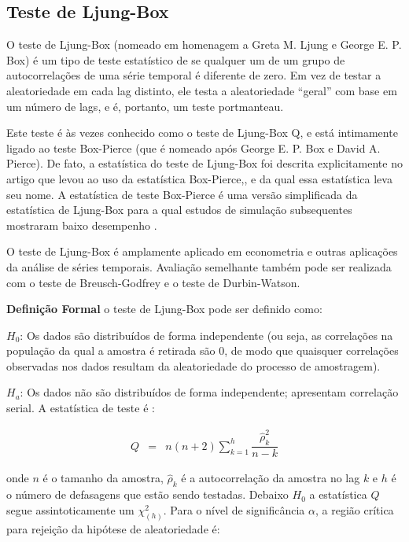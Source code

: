\subsection{Teste de Ljung-Box}

O teste de Ljung-Box (nomeado em homenagem a Greta M. Ljung e George E. P. Box) é um tipo de teste estatístico de se qualquer um de um grupo de autocorrelações de uma série temporal é diferente de zero. Em vez de testar a aleatoriedade em cada lag distinto, ele testa a aleatoriedade ``geral'' com base em um número de lags, e é, portanto, um teste portmanteau.

Este teste é às vezes conhecido como o teste de Ljung-Box Q, e está intimamente ligado ao teste Box-Pierce (que é nomeado após George E. P. Box e David A. Pierce). De fato, a estatística do teste de Ljung-Box foi descrita explicitamente no artigo que levou ao uso da estatística Box-Pierce,\cite{box}, \cite{ljung} e da qual essa estatística leva seu nome. A estatística de teste Box-Pierce é uma versão simplificada da estatística de Ljung-Box para a qual estudos de simulação subsequentes mostraram baixo desempenho \cite{dav}.

O teste de Ljung-Box é amplamente aplicado em econometria e outras aplicações da análise de séries temporais. Avaliação semelhante também pode ser realizada com o teste de Breusch-Godfrey e o teste de Durbin-Watson.

\noindent\textbf{Defini\c c\~ao Formal}
o teste de Ljung-Box pode ser definido como:

$H_0$: Os dados são distribuídos de forma independente (ou seja, as correlações na população da qual a amostra é retirada são 0, de modo que quaisquer correlações observadas nos dados resultam da aleatoriedade do processo de amostragem).

$H_a$: Os dados não são distribuídos de forma independente; apresentam correlação serial.
A estatística de teste é \cite{ljung}:

\begin{eqnarray}
	Q&=&n(n+2) \sum_{k=1}^h \dfrac{\hat{\rho}_k^2}{n-k}
\end{eqnarray}

\noindent onde $n$ é o tamanho da amostra, $\hat{\rho}_k$ é a autocorrelação da amostra no lag $k$ e $h$ é o número de defasagens que estão sendo testadas. Debaixo $H_0$ a estatística $Q$ segue assintoticamente um $\chi_{(h)}^2$. Para o nível de significância $\alpha$, a região crítica para rejeição da hipótese de aleatoriedade é:


